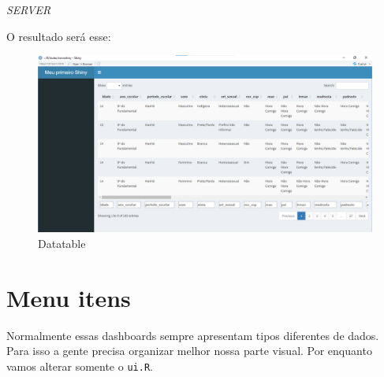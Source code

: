 \documentclass[
]{book}
\newenvironment{Shaded}{\begin{snugshade}}{\end{snugshade}}
\newcommand{\AttributeTok}[1]{\textcolor[rgb]{0.77,0.63,0.00}{#1}}
\newcommand{\CommentTok}[1]{\textcolor[rgb]{0.56,0.35,0.01}{\textit{#1}}}
\newcommand{\ConstantTok}[1]{\textcolor[rgb]{0.00,0.00,0.00}{#1}}
\newcommand{\ControlFlowTok}[1]{\textcolor[rgb]{0.13,0.29,0.53}{\textbf{#1}}}
\newcommand{\DecValTok}[1]{\textcolor[rgb]{0.00,0.00,0.81}{#1}}
\newcommand{\FunctionTok}[1]{\textcolor[rgb]{0.00,0.00,0.00}{#1}}
\newcommand{\NormalTok}[1]{#1}
\newcommand{\OtherTok}[1]{\textcolor[rgb]{0.56,0.35,0.01}{#1}}
\newcommand{\SpecialCharTok}[1]{\textcolor[rgb]{0.00,0.00,0.00}{#1}}
\newcommand{\StringTok}[1]{\textcolor[rgb]{0.31,0.60,0.02}{#1}}
\begin{document}
\emph{SERVER}

\begin{Shaded}
\end{Shaded}

O resultado será esse:

\begin{figure}
\centering
\includegraphics{./imagens/cap10imagem12.png}
\caption{Datatable}
\end{figure}

\hypertarget{menu-itens}{%
\section{Menu itens}\label{menu-itens}}

Normalmente essas dashboards sempre apresentam tipos diferentes de dados. Para isso a gente precisa organizar melhor nossa parte visual. Por enquanto vamos alterar somente o \texttt{ui.R}.
\end{document}
